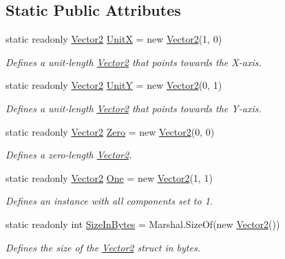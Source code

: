\subsection*{Static Public Attributes}
\begin{DoxyCompactItemize}
\item 
static readonly \hyperlink{struct_open_t_k_1_1_vector2}{Vector2} \hyperlink{struct_open_t_k_1_1_vector2_a7f2eba13c36cf07b242119014b3cc959}{Unit\-X} = new \hyperlink{struct_open_t_k_1_1_vector2}{Vector2}(1, 0)
\begin{DoxyCompactList}\small\item\em Defines a unit-\/length \hyperlink{struct_open_t_k_1_1_vector2}{Vector2} that points towards the X-\/axis. \end{DoxyCompactList}\item 
static readonly \hyperlink{struct_open_t_k_1_1_vector2}{Vector2} \hyperlink{struct_open_t_k_1_1_vector2_ae71028930b0fc4172fddddad30a6cf23}{Unit\-Y} = new \hyperlink{struct_open_t_k_1_1_vector2}{Vector2}(0, 1)
\begin{DoxyCompactList}\small\item\em Defines a unit-\/length \hyperlink{struct_open_t_k_1_1_vector2}{Vector2} that points towards the Y-\/axis. \end{DoxyCompactList}\item 
static readonly \hyperlink{struct_open_t_k_1_1_vector2}{Vector2} \hyperlink{struct_open_t_k_1_1_vector2_af9a8e6eee1e15bcc8e29d6c91a3793b4}{Zero} = new \hyperlink{struct_open_t_k_1_1_vector2}{Vector2}(0, 0)
\begin{DoxyCompactList}\small\item\em Defines a zero-\/length \hyperlink{struct_open_t_k_1_1_vector2}{Vector2}. \end{DoxyCompactList}\item 
static readonly \hyperlink{struct_open_t_k_1_1_vector2}{Vector2} \hyperlink{struct_open_t_k_1_1_vector2_a3c2a6572678eea7593aa3695aafabd63}{One} = new \hyperlink{struct_open_t_k_1_1_vector2}{Vector2}(1, 1)
\begin{DoxyCompactList}\small\item\em Defines an instance with all components set to 1. \end{DoxyCompactList}\item 
static readonly int \hyperlink{struct_open_t_k_1_1_vector2_aaf8d679a6cda1dec33be45038974e04d}{Size\-In\-Bytes} = Marshal.\-Size\-Of(new \hyperlink{struct_open_t_k_1_1_vector2}{Vector2}())
\begin{DoxyCompactList}\small\item\em Defines the size of the \hyperlink{struct_open_t_k_1_1_vector2}{Vector2} struct in bytes. \end{DoxyCompactList}\end{DoxyCompactItemize}
